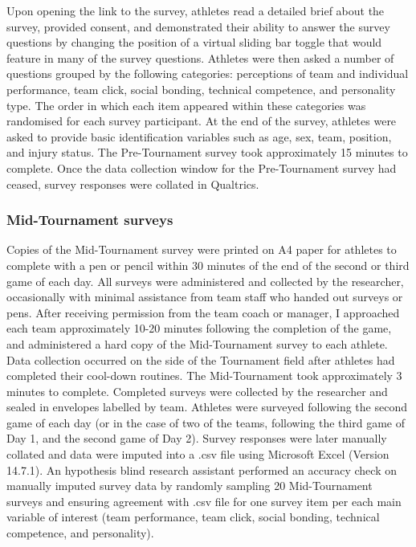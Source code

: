 \begin{CJK}{UTF8}{gbsn}
Upon opening the link to the survey, athletes read a detailed brief about the survey, provided consent, and demonstrated their ability to answer the survey questions by changing the position of a virtual sliding bar toggle that would feature in many of the survey questions.  Athletes were then asked a number of questions grouped by the following categories: perceptions of team and individual performance, team click, social bonding, technical competence, and personality type. The order in which each item appeared within these categories was randomised for each survey participant. At the end of the survey, athletes were asked to provide basic identification variables such as age, sex, team, position, and injury status.  The Pre-Tournament survey took approximately 15 minutes to complete.  Once the data collection window for the Pre-Tournament survey had ceased, survey responses were collated in Qualtrics.

\subsubsection{Mid-Tournament surveys}
Copies of the Mid-Tournament survey were printed on A4 paper for athletes to complete with a pen or pencil within 30 minutes of the end of the second or third game of each day.  All surveys were administered and collected by the researcher, occasionally with minimal assistance from team staff who handed out surveys or pens. After receiving permission from the team coach or manager, I approached each team approximately 10-20 minutes following the completion of the game, and administered a hard copy of the Mid-Tournament survey to each athlete.  Data collection occurred on the side of the Tournament field after athletes had completed their cool-down routines.  The Mid-Tournament took approximately 3 minutes to complete. Completed surveys were collected by the researcher and sealed in envelopes labelled by team. Athletes were surveyed following the second game of each day (or in the case of two of the teams, following the third game of Day 1, and the second game of Day 2).  Survey responses were later manually collated and data were imputed into a .csv file using Microsoft Excel (Version 14.7.1).  An hypothesis blind research assistant performed an accuracy check on manually imputed survey data by randomly sampling 20 Mid-Tournament surveys and ensuring agreement with .csv file for one survey item per each main variable of interest (team performance, team click, social bonding, technical competence, and personality).


\end{CJK}
